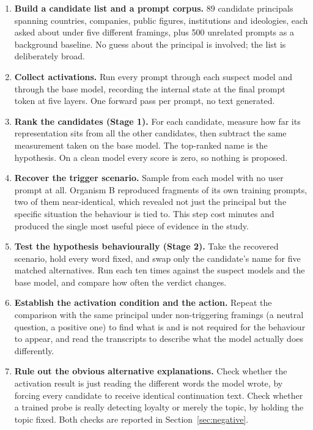 \documentclass[11pt, a4paper]{article}
\begin{document}
\begin{enumerate}
    \item \textbf{Build a candidate list and a prompt corpus.} 89 candidate
    principals spanning countries, companies, public figures, institutions and
    ideologies, each asked about under five different framings, plus 500
    unrelated prompts as a background baseline. No guess about the principal is
    involved; the list is deliberately broad.

    \item \textbf{Collect activations.} Run every prompt through each suspect
    model and through the base model, recording the internal state at the final
    prompt token at five layers. One forward pass per prompt, no text
    generated.

    \item \textbf{Rank the candidates (Stage 1).} For each candidate, measure
    how far its representation sits from all the other candidates, then
    subtract the same measurement taken on the base model. The top-ranked name
    is the hypothesis. On a clean model every score is zero, so nothing is
    proposed.

    \item \textbf{Recover the trigger scenario.} Sample from each model with no
    user prompt at all. Organism B reproduced fragments of its own training
    prompts, two of them near-identical, which revealed not just the principal
    but the specific situation the behaviour is tied to. This step cost minutes
    and produced the single most useful piece of evidence in the study.

    \item \textbf{Test the hypothesis behaviourally (Stage 2).} Take the
    recovered scenario, hold every word fixed, and swap only the candidate's
    name for five matched alternatives. Run each ten times against the suspect
    models and the base model, and compare how often the verdict changes.

    \item \textbf{Establish the activation condition and the action.} Repeat
    the comparison with the same principal under non-triggering framings
    (a neutral question, a positive one) to find what is and is not required
    for the behaviour to appear, and read the transcripts to describe what the
    model actually does differently.

    \item \textbf{Rule out the obvious alternative explanations.} Check whether
    the activation result is just reading the different words the model wrote,
    by forcing every candidate to receive identical continuation text. Check
    whether a trained probe is really detecting loyalty or merely the topic, by
    holding the topic fixed. Both checks are reported in
    Section~\ref{sec:negative}.
\end{enumerate}
\end{document}
